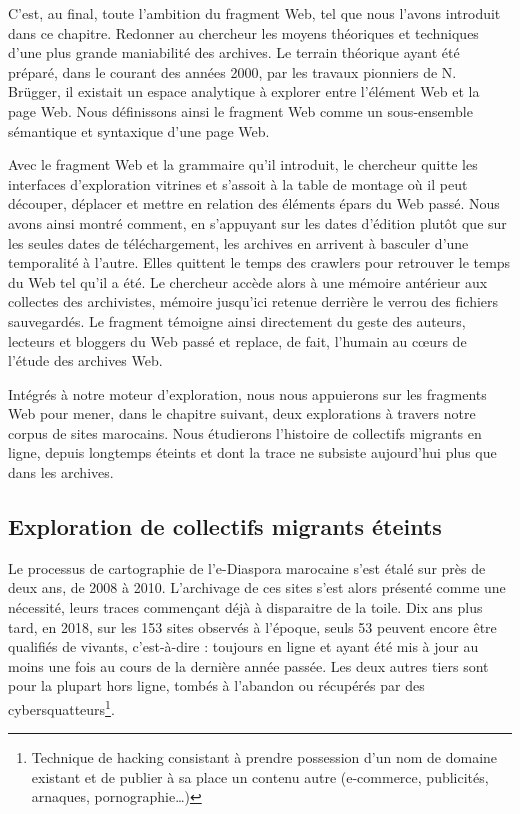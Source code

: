 \documentclass[symmetric,justified,marginals=raggedouter]{tufte-book}
\begin{document}
C'est, au final, toute l'ambition du fragment Web, tel que nous l'avons introduit dans ce chapitre. Redonner au chercheur les moyens théoriques et techniques d'une plus grande maniabilité des archives. Le terrain théorique ayant été préparé, dans le courant des années 2000, par les travaux pionniers de N. Brügger, il existait un espace analytique à explorer entre l'élément Web et la page Web. Nous définissons ainsi le fragment Web comme un sous-ensemble sémantique et syntaxique d'une page Web.

Avec le fragment Web et la grammaire qu'il introduit, le chercheur quitte les interfaces d'exploration vitrines et s'assoit à la table de montage où il peut découper, déplacer et mettre en relation des éléments épars du Web passé. Nous avons ainsi montré comment, en s'appuyant sur les dates d'édition plutôt que sur les seules dates de téléchargement, les archives en arrivent à basculer d'une temporalité à l'autre. Elles quittent le temps des crawlers pour retrouver le temps du Web tel qu'il a été. Le chercheur accède alors à une mémoire antérieur aux collectes des archivistes, mémoire jusqu'ici retenue derrière le verrou des fichiers sauvegardés. Le fragment témoigne ainsi directement du geste des auteurs, lecteurs et bloggers du Web passé et replace, de fait, l'humain au cœurs de l'étude des archives Web.

Intégrés à notre moteur d'exploration, nous nous appuierons sur les fragments Web pour mener, dans le chapitre suivant, deux explorations à travers notre corpus de sites marocains. Nous étudierons l'histoire de collectifs migrants en ligne, depuis longtemps éteints et dont la trace ne subsiste aujourd'hui plus que dans les archives.  



\cleardoublepage
\begin{minipage}[t,leftmargin=5em]{1.5\linewidth}%
\begin{adjustwidth}{-0.5cm}{}
\chapter{Exploration de collectifs migrants éteints} 
\label{chap:6}
\end{adjustwidth}
\end{minipage}
\hfill

\noindent Le processus de cartographie de l'e-Diaspora marocaine s'est étalé sur près de deux ans, de 2008 à 2010. L'archivage de ces sites s'est alors présenté comme une nécessité, leurs traces commençant déjà à disparaitre de la toile. Dix ans plus tard, en 2018, sur les 153 sites observés à l'époque, seuls 53 peuvent encore être qualifiés de vivants, c'est-à-dire : toujours en ligne et ayant été mis à jour au moins une fois au cours de la dernière année passée. Les deux autres tiers sont pour la plupart hors ligne, tombés à l'abandon ou récupérés par des cybersquatteurs\footnote{\RaggedOuter Technique de hacking consistant à prendre possession d'un nom de domaine existant et de publier à sa place un contenu autre (e-commerce, publicités, arnaques, pornographie\ldots{})}.      
\end{document}
